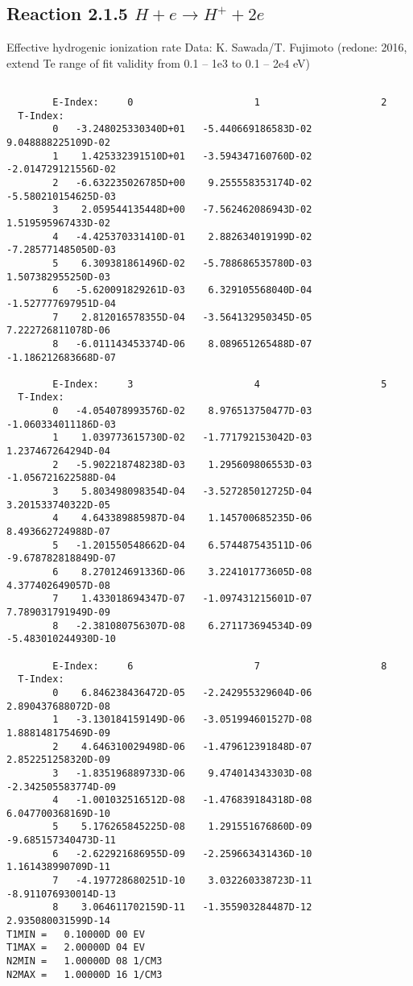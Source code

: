 \documentclass[12pt,dvipdfmx]{article}
\begin{document}
{\subsection{
Reaction 2.1.5 $H + e \rightarrow H^+ + 2e $ }

   Effective hydrogenic ionization rate    Data: K. Sawada/T. Fujimoto (redone: 2016,
extend Te range of fit validity from 0.1 -- 1e3 to 0.1 -- 2e4 eV)
   \cite{kn:Sawada}

\begin{small}\begin{verbatim}

        E-Index:     0                     1                     2
  T-Index:
        0   -3.248025330340D+01   -5.440669186583D-02    9.048888225109D-02
        1    1.425332391510D+01   -3.594347160760D-02   -2.014729121556D-02
        2   -6.632235026785D+00    9.255558353174D-02   -5.580210154625D-03
        3    2.059544135448D+00   -7.562462086943D-02    1.519595967433D-02
        4   -4.425370331410D-01    2.882634019199D-02   -7.285771485050D-03
        5    6.309381861496D-02   -5.788686535780D-03    1.507382955250D-03
        6   -5.620091829261D-03    6.329105568040D-04   -1.527777697951D-04
        7    2.812016578355D-04   -3.564132950345D-05    7.222726811078D-06
        8   -6.011143453374D-06    8.089651265488D-07   -1.186212683668D-07

        E-Index:     3                     4                     5
  T-Index:
        0   -4.054078993576D-02    8.976513750477D-03   -1.060334011186D-03
        1    1.039773615730D-02   -1.771792153042D-03    1.237467264294D-04
        2   -5.902218748238D-03    1.295609806553D-03   -1.056721622588D-04
        3    5.803498098354D-04   -3.527285012725D-04    3.201533740322D-05
        4    4.643389885987D-04    1.145700685235D-06    8.493662724988D-07
        5   -1.201550548662D-04    6.574487543511D-06   -9.678782818849D-07
        6    8.270124691336D-06    3.224101773605D-08    4.377402649057D-08
        7    1.433018694347D-07   -1.097431215601D-07    7.789031791949D-09
        8   -2.381080756307D-08    6.271173694534D-09   -5.483010244930D-10

        E-Index:     6                     7                     8
  T-Index:
        0    6.846238436472D-05   -2.242955329604D-06    2.890437688072D-08
        1   -3.130184159149D-06   -3.051994601527D-08    1.888148175469D-09
        2    4.646310029498D-06   -1.479612391848D-07    2.852251258320D-09
        3   -1.835196889733D-06    9.474014343303D-08   -2.342505583774D-09
        4   -1.001032516512D-08   -1.476839184318D-08    6.047700368169D-10
        5    5.176265845225D-08    1.291551676860D-09   -9.685157340473D-11
        6   -2.622921686955D-09   -2.259663431436D-10    1.161438990709D-11
        7   -4.197728680251D-10    3.032260338723D-11   -8.911076930014D-13
        8    3.064611702159D-11   -1.355903284487D-12    2.935080031599D-14
T1MIN =   0.10000D 00 EV
T1MAX =   2.00000D 04 EV
N2MIN =   1.00000D 08 1/CM3
N2MAX =   1.00000D 16 1/CM3


\end{verbatim}
\end{small}}
\end{document}
